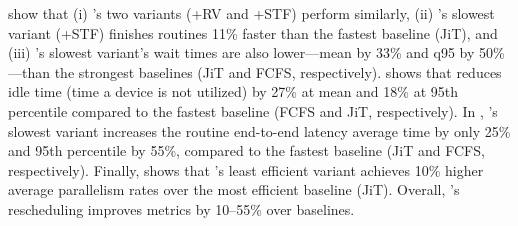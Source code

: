  show that 
(i) \sysname's two variants (\scheduler+RV and \scheduler+STF) perform similarly,
(ii) \sysname's slowest variant (\scheduler+STF) finishes routines 11\% faster than the fastest baseline (JiT), and
(iii) \sysname's slowest variant's wait times are also lower---mean by 33\% and q95 by 50\%---than the strongest baselines (JiT and FCFS, respectively).
 shows that \sysname{} reduces idle time (time a device is not utilized) by 27\% at mean and 18\% at 95th percentile compared to the fastest baseline (FCFS and JiT, respectively).
In , \sysname{}'s slowest variant increases the routine end-to-end latency average time by only 25\% and 95th percentile by 55\%, compared to the fastest baseline (JiT and FCFS, respectively).
Finally,  shows that \sysname{}'s least efficient variant achieves 10\% higher average parallelism rates over the most efficient baseline (JiT). 
Overall, \sysname's rescheduling improves metrics by 10--55\% over baselines.
